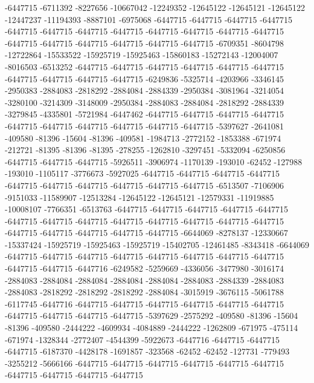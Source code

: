 -6447715 -6711392 -8227656 -10667042 -12249352 -12645122 -12645121 -12645122 -12447237 -11194393 -8887101 -6975068 -6447715 -6447715 -6447715 -6447715 -6447715 -6447715 -6447715 -6447715 -6447715 -6447715 -6447715 -6447715 -6447715 -6447715 -6447715 -6447715 -6447715 -6447715 -6709351 -8604798 -12722864 -15533522 -15925719 -15925463 -15860183 -15272143 -12004007 -8016503 -6513252 -6447715 -6447715 -6447715 -6447715 -6447715 -6447715 -6447715 -6447715 -6447715 -6447715 -6249836 -5325714 -4203966 -3346145 -2950383 -2884083 -2818292 -2884084 -2884339 -2950384 -3081964 -3214054 -3280100 -3214309 -3148009 -2950384 -2884083 -2884084 -2818292 -2884339 -3279845 -4335801 -5721984 -6447462 -6447715 -6447715 -6447715 -6447715 -6447715 -6447715 -6447715 -6447715 -6447715 -6447715 -5397627 -2641081 -409580 -81396 -15604 -81396 -409581 -1984713 -2772152 -1853388 -671974 -212721 -81395 -81396 -81395 -278255 -1262810 -3297451 -5332094 -6250856 -6447715 -6447715 -6447715 -5926511 -3906974 -1170139 -193010 -62452 -127988 -193010 -1105117 -3776673 -5927025 -6447715 -6447715 -6447715 -6447715 -6447715 -6447715 -6447715 -6447715 -6447715 -6447715
-6513507 -7106906 -9151033 -11589907 -12513284 -12645122 -12645121 -12579331 -11919885 -10008107 -7766351 -6513763 -6447715 -6447715 -6447715 -6447715 -6447715 -6447715 -6447715 -6447715 -6447715 -6447715 -6447715 -6447715 -6447715 -6447715 -6447715 -6447715 -6447715 -6447715 -6644069 -8278137 -12330667 -15337424 -15925719 -15925463 -15925719 -15402705 -12461485 -8343418 -6644069 -6447715 -6447715 -6447715 -6447715 -6447715 -6447715 -6447715 -6447715 -6447715 -6447715 -6447716 -6249582 -5259669 -4336056 -3477980 -3016174 -2884083 -2884084 -2884084 -2884084 -2884084 -2884083 -2884339 -2884083 -2884083 -2818292 -2818292 -2818292 -2884084 -3015919 -3676115 -5061788 -6117745 -6447716 -6447715 -6447715 -6447715 -6447715 -6447715 -6447715 -6447715 -6447715 -6447715 -6447715 -5397629 -2575292 -409580 -81396 -15604 -81396 -409580 -2444222 -4609934 -4084889 -2444222 -1262809 -671975 -475114 -671974 -1328344 -2772407 -4544399 -5922673 -6447716 -6447715 -6447715 -6447715 -6187370 -4428178 -1691857 -323568 -62452 -62452 -127731 -779493 -3255212 -5666166 -6447715 -6447715 -6447715 -6447715 -6447715 -6447715 -6447715 -6447715 -6447715 -6447715
